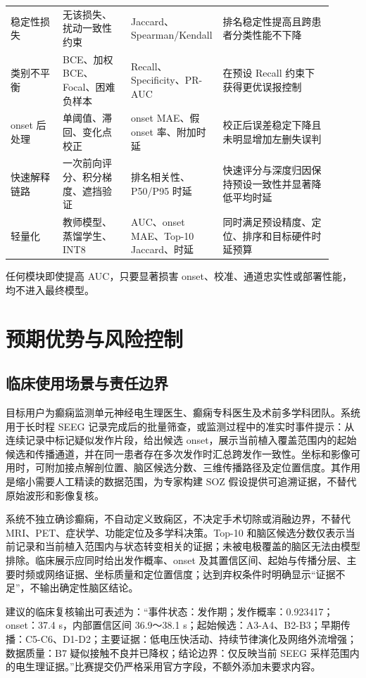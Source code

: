 \begin{longtable}{@{}p{0.16\linewidth}p{0.21\linewidth}p{0.20\linewidth}p{0.34\linewidth}@{}}
    稳定性损失 & 无该损失、扰动一致性约束 & Jaccard、Spearman/Kendall & 排名稳定性提高且跨患者分类性能不下降 \\
    类别不平衡 & BCE、加权 BCE、Focal、困难负样本 & Recall、Specificity、PR-AUC & 在预设 Recall 约束下获得更优误报控制 \\
    onset 后处理 & 单阈值、滞回、变化点校正 & onset MAE、假 onset 率、附加时延 & 校正后误差稳定下降且未明显增加左删失误判 \\
    快速解释链路 & 一次前向评分、积分梯度、遮挡验证 & 排名相关性、P50/P95 时延 & 快速评分与深度归因保持预设一致性并显著降低平均时延 \\
    轻量化 & 教师模型、蒸馏学生、INT8 & AUC、onset MAE、Top-10 Jaccard、时延 & 同时满足预设精度、定位、排序和目标硬件时延预算 \\
\end{longtable}
\endgroup

任何模块即使提高 AUC，只要显著损害 onset、校准、通道忠实性或部署性能，均不进入最终模型。

\clearpage
\section{预期优势与风险控制}

\subsection{临床使用场景与责任边界}

目标用户为癫痫监测单元神经电生理医生、癫痫专科医生及术前多学科团队。系统用于长时程 SEEG 记录完成后的批量筛查，或监测过程中的准实时事件提示：从连续记录中标记疑似发作片段，给出候选 onset，展示当前植入覆盖范围内的起始候选和传播通道，并在同一患者存在多次发作时汇总跨发作一致性。坐标和影像可用时，可附加接点解剖位置、脑区候选分数、三维传播路径及定位置信度。其作用是缩小需要人工精读的数据范围，为专家构建 SOZ 假设提供可追溯证据，不替代原始波形和影像复核。

系统不独立确诊癫痫，不自动定义致痫区，不决定手术切除或消融边界，不替代 MRI、PET、症状学、功能定位及多学科决策。Top-10 和脑区候选分数仅表示当前记录和当前植入范围内与状态转变相关的证据；未被电极覆盖的脑区无法由模型排除。临床展示应同时给出发作概率、onset 及其置信区间、起始与传播分层、主要时频或网络证据、坐标质量和定位置信度；达到弃权条件时明确显示“证据不足”，不输出确定性脑区结论。

建议的临床复核输出可表述为：“事件状态：发作期；发作概率：0.923417；onset：37.4 s，内部置信区间 36.9～38.1 s；起始候选：A3-A4、B2-B3；早期传播：C5-C6、D1-D2；主要证据：低电压快活动、持续节律演化及网络外流增强；数据质量：B7 疑似接触不良并已降权；结论边界：仅反映当前 SEEG 采样范围内的电生理证据。”比赛提交仍严格采用官方字段，不额外添加未要求内容。

